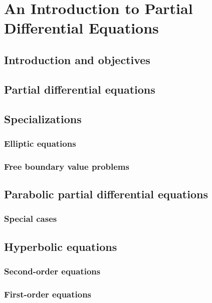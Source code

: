 \chapter{An Introduction to Partial Differential Equations}

\section{Introduction and objectives}

\section{Partial differential equations}

\section{Specializations}

\subsection{Elliptic equations}

\subsection{Free boundary value problems}

\section{Parabolic partial differential equations}

\subsection{Special cases}

\section{Hyperbolic equations}

\subsection{Second-order equations}

\subsection{First-order equations}


